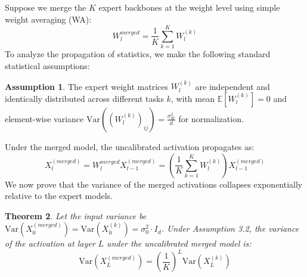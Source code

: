 \documentclass{article}
\theoremstyle{plain}
\newtheorem{theorem}{Theorem}[section]
\theoremstyle{definition}
\newtheorem{assumption}[theorem]{Assumption}
\theoremstyle{remark}
\begin{document}
Suppose we merge the $K$ expert backbones at the weight level using simple weight averaging (WA):
\begin{equation}
W_l^{merged} = \frac{1}{K} \sum_{k=1}^K W_l^{(k)}
\end{equation}
To analyze the propagation of statistics, we make the following standard statistical assumptions:
\begin{assumption}
The expert weight matrices $W_l^{(k)}$ are independent and identically distributed across different tasks $k$, with mean $\mathbb{E}[W_l^{(k)}] = 0$ and element-wise variance $\text{Var}((W_l^{(k)})_{ij}) = \frac{\sigma_W^2}{d}$ for normalization.
\end{assumption}

Under the merged model, the uncalibrated activation propagates as:
\begin{equation}
X_l^{(merged)} = W_l^{merged} X_{l-1}^{(merged)} = \left(\frac{1}{K} \sum_{k=1}^K W_l^{(k)}\right) X_{l-1}^{(merged)}
\end{equation}
We now prove that the variance of the merged activations collapses exponentially relative to the expert models.
\begin{theorem}
Let the input variance be $\text{Var}(X_0^{(merged)}) = \text{Var}(X_0^{(k)}) = \sigma_0^2 \cdot I_d$. Under Assumption 3.2, the variance of the activation at layer $L$ under the uncalibrated merged model is:
\begin{equation}
\text{Var}(X_L^{(merged)}) = \left(\frac{1}{K}\right)^L \text{Var}(X_L^{(k)})
\end{equation}
\end{theorem}
\end{document}
